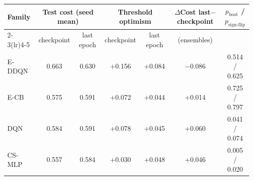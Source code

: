 \begin{tabular}{lcccccc}
\toprule
Family & \multicolumn{2}{c}{Test cost (seed mean)} & \multicolumn{2}{c}{Threshold optimism} & $\Delta$Cost last$-$checkpoint & $p_{\text{boot}}$ / $p_{\text{sign-flip}}$ \\
\cmidrule(lr){2-3}\cmidrule(lr){4-5}
 & checkpoint & last epoch & checkpoint & last epoch & (ensembles) & \\
\midrule
E-DDQN & 0.663 & 0.630 & +0.156 & +0.084 & $-$0.086 & 0.514 / 0.625 \\
E-CB & 0.575 & 0.591 & +0.072 & +0.044 & +0.014 & 0.725 / 0.797 \\
DQN & 0.584 & 0.591 & +0.078 & +0.045 & +0.060 & 0.041 / 0.074 \\
CS-MLP & 0.557 & 0.584 & +0.030 & +0.048 & +0.046 & 0.005 / 0.020 \\
\bottomrule
\end{tabular}
